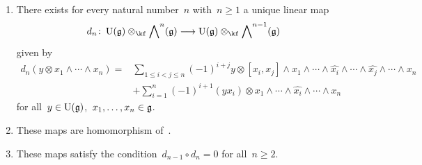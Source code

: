 \begin{proposition}
  \label{construction of koszul differential}
  \leavevmode
  \begin{enumerate}
    \item
      There exists for every natural number~$n$ with~$n \geq 1$ a unique linear map
      \[
        d_n
        \colon
        \Univ(\glie) \otimes_{\kf} \Exterior^n(\glie)
        \to
        \Univ(\glie) \otimes_{\kf} \Exterior^{n-1}(\glie)
      \]
      given by
      \begin{align*}
        d_n( y \otimes x_1 \wedge \dotsb \wedge x_n )   
        ={}&
        \sum_{1 \leq i < j \leq n}
        (-1)^{i+j}
        y \otimes [x_i, x_j] \wedge x_1 \wedge \dotsb \wedge \widehat{x_i} \wedge \dotsb \wedge \widehat{x_j} \wedge \dotsb \wedge x_n
        \\
        {}&
        +
        \sum_{i=1}^n
        (-1)^{i+1}
        (y x_i) \otimes x_1 \wedge \dotsb \wedge \widehat{ x_i } \wedge \dotsb \wedge x_n
      \end{align*}
      for all~$y \in \operatorname{U}(\mathfrak{g})$,~$x_1, \dotsc, x_n \in \mathfrak{g}$.
    \item
      These maps are homomorphism of~\modules{$\Univ(\glie)$}.
    \item
      These maps satisfy the condition~$d_{n-1} \circ d_n = 0$ for all~$n \geq 2$.
  \end{enumerate}
\end{proposition}


